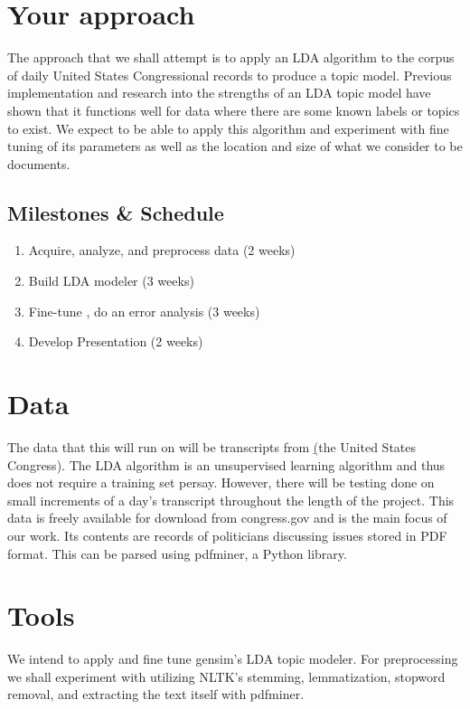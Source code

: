 \documentclass[11pt,a4paper]{article}
\begin{document}
\section{Your approach}
The approach that we shall attempt is to apply an LDA algorithm to the corpus of daily United States Congressional records to produce a topic model. Previous implementation and research into the strengths of an LDA topic model have shown that it functions well for data where there are some known labels or topics to exist. We expect to be able to apply this algorithm and experiment with fine tuning of its parameters as well as the location and size of what we consider to be documents.

\subsection{Milestones \& Schedule}

\begin{enumerate}
    \item Acquire, analyze, and preprocess data (2 weeks)
    \item Build LDA modeler (3 weeks)
    \item Fine-tune , do an error analysis (3 weeks)
    \item Develop Presentation (2 weeks)
\end{enumerate}

\section{Data}
The data that this will run on will be transcripts from \href{https://www.congress.gov/congressional-record}(the United States Congress). The LDA algorithm is an unsupervised learning algorithm and thus does not require a training set persay. However, there will be testing done on small increments of a day's transcript throughout the length of the project. This data is freely available for download from congress.gov and is the main focus of our work. Its contents are records of politicians discussing issues stored in PDF format. This can be parsed using pdfminer, a Python library.

\section{Tools}
We intend to apply and fine tune gensim's LDA topic modeler. For preprocessing we shall experiment with utilizing NLTK's stemming, lemmatization, stopword removal, and extracting the text itself with pdfminer. 


\footnotesize

\end{document}
